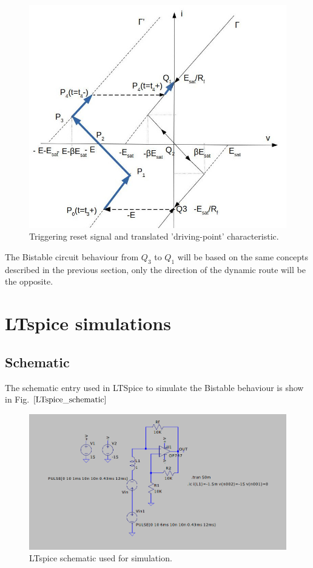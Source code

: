 \documentclass[letterpaper,11pt]{article}
\begin{document}
\begin{figure}[!ht]
        \centering \includegraphics[width=0.9\columnwidth]{driving-point-characteristic-back-shifted.jpg}
        \caption{\label{triggering-reset-signal-translated-driving-point2}Triggering reset signal and translated 'driving-point' characteristic.
        }
\end{figure}
%
The Bistable circuit behaviour from $Q_3$ to $Q_1$ will be based on the same concepts described in the previous section, only the direction of the dynamic route will be the opposite.
%
\section{LTspice simulations}
\subsection{Schematic}
The schematic entry used in LTSpice to simulate the Bistable behaviour is show in Fig. $\ref{LTspice_schematic}$
\begin{figure}[!ht]
        \centering \includegraphics[width=0.8\columnwidth]{bistable-schematic.png}
        \caption{\label{LTspice_schematic}LTspice schematic used for simulation.
        }
\end{figure}
%
\end{document}
